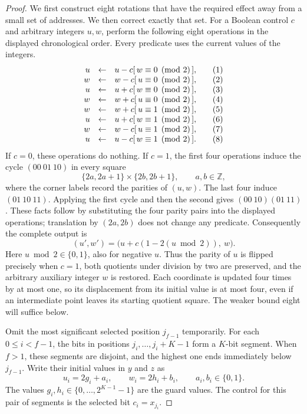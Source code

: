 \begin{proof}
We first construct eight rotations that have the required effect away
from a small set of addresses. We then correct exactly that set.
For a Boolean control $c$ and arbitrary integers $u,w$, perform the following
eight operations in the displayed chronological order. Every predicate
uses the current values of the integers.
\begin{equation}
\label{eq:eight-packed-additions}
\begin{array}{rcl@{\qquad}l}
u&\leftarrow&u-c[\,w\equiv0\pmod2\,],&(1)\\
w&\leftarrow&w-c[\,u\equiv0\pmod2\,],&(2)\\
u&\leftarrow&u+c[\,w\equiv0\pmod2\,],&(3)\\
w&\leftarrow&w+c[\,u\equiv0\pmod2\,],&(4)\\
w&\leftarrow&w+c[\,u\equiv1\pmod2\,],&(5)\\
u&\leftarrow&u+c[\,w\equiv1\pmod2\,],&(6)\\
w&\leftarrow&w-c[\,u\equiv1\pmod2\,],&(7)\\
u&\leftarrow&u-c[\,w\equiv1\pmod2\,].&(8)
\end{array}
\end{equation}
If $c=0$, these operations do nothing. If $c=1$, the first four operations
induce the cycle $(00\ 01\ 10)$ in every square
\[
 \{2a,2a+1\}\times\{2b,2b+1\},\qquad a,b\in\mathbb Z,
\]
where the corner labels record the parities of $(u,w)$. The last four
induce $(01\ 10\ 11)$. Applying the first cycle and then the second gives
$(00\ 10)(01\ 11)$. These facts follow by substituting the four parity
pairs into the displayed operations; translation by $(2a,2b)$ does not
change any predicate. Consequently the complete output is
\begin{equation}
\label{eq:eight-packed-result}
 (u',w')=
 \bigl(u+c(1-2(u\bmod2)),\ w\bigr).
\end{equation}
Here $u\bmod2\in\{0,1\}$, also for negative $u$. Thus the parity of $u$
is flipped precisely when $c=1$, both quotients under division by two are
preserved, and the arbitrary auxiliary integer $w$ is restored. Each
coordinate is updated four times by at most one, so its displacement
from its initial value is at most four, even if an intermediate point
leaves its starting quotient square. The weaker bound eight will suffice below.

Omit the most significant selected position $j_{f-1}$ temporarily. For
each $0\le i<f-1$, the bits in positions
$j_i,\ldots,j_i+K-1$ form a $K$-bit segment. When $f>1$, these segments
are disjoint, and the highest one ends immediately below $j_{f-1}$.
Write their initial values in $y$ and $z$ as
\[
 u_i=2g_i+a_i,\qquad w_i=2h_i+b_i,
 \qquad a_i,b_i\in\{0,1\}.
\]
The values $g_i,h_i\in\{0,\ldots,2^{K-1}-1\}$ are the guard values. The
control for this pair of segments is the selected bit $c_i=x_{j_i}$.


\end{proof}
